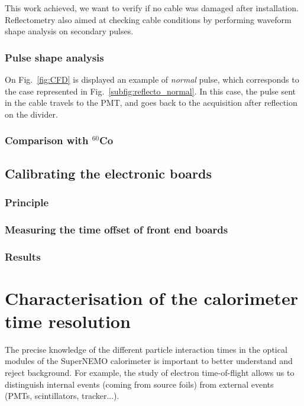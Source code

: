 This work achieved, we want to verify if no cable was damaged after installation.
Reflectometry also aimed at checking cable conditions by performing waveform shape analysis on secondary pulses.

\subsection{Pulse shape analysis}
\label{subsec:pulse_shape}
On Fig.~\ref{fig:CFD} is displayed an example of \emph{normal} pulse, which corresponds to the case represented in Fig.~\ref{subfig:reflecto_normal}.
In this case, the pulse sent in the cable travels to the PMT, and goes back to the acquisition after reflection on the divider.


\subsection{Comparison with $^{60}$Co}






\section{Calibrating the electronic boards}
\label{sec:TimeSynchroFEB}

\subsection{Principle}
\subsection{Measuring the time offset of front end boards}
\subsection{Results}







\chapter{Characterisation of the calorimeter time resolution}

The precise knowledge of the different particle interaction times in the optical modules of the SuperNEMO calorimeter is important to better understand and reject background.
For example, the study of electron time-of-flight allows us to distinguish internal events (coming from source foils) from external events (PMTs, scintillators, tracker...).
\newline

